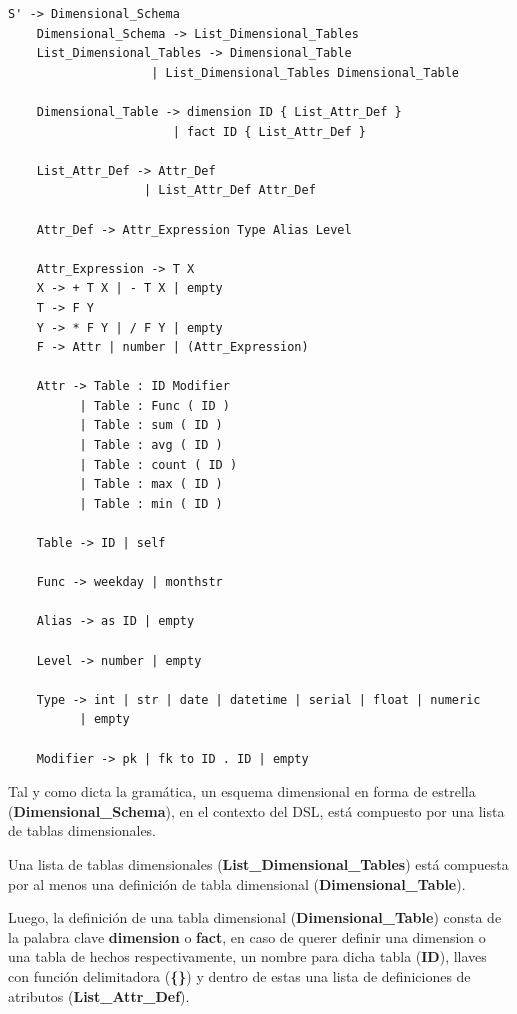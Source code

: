 \begin{lstlisting}[label={code:CFG},caption={Gram\'atica libre del contexto del lenguaje de dominio espec\'ifico}]
    S' -> Dimensional_Schema
    Dimensional_Schema -> List_Dimensional_Tables
    List_Dimensional_Tables -> Dimensional_Table
                    | List_Dimensional_Tables Dimensional_Table

    Dimensional_Table -> dimension ID { List_Attr_Def }
                       | fact ID { List_Attr_Def }

    List_Attr_Def -> Attr_Def
                   | List_Attr_Def Attr_Def

    Attr_Def -> Attr_Expression Type Alias Level

    Attr_Expression -> T X
    X -> + T X | - T X | empty
    T -> F Y
    Y -> * F Y | / F Y | empty
    F -> Attr | number | (Attr_Expression)

    Attr -> Table : ID Modifier
          | Table : Func ( ID )
          | Table : sum ( ID )
          | Table : avg ( ID )
          | Table : count ( ID )
          | Table : max ( ID )
          | Table : min ( ID )

    Table -> ID | self

    Func -> weekday | monthstr

    Alias -> as ID | empty

    Level -> number | empty

    Type -> int | str | date | datetime | serial | float | numeric 
          | empty

    Modifier -> pk | fk to ID . ID | empty
\end{lstlisting}

Tal y como dicta la gramática, un esquema dimensional en forma de estrella (\textbf{Dimensional\_Schema}), 
en el contexto del DSL, est\'a compuesto por una lista de tablas 
dimensionales. 

Una lista de tablas dimensionales (\textbf{List\_Dimensional\_Tables}) est\'a compuesta por al menos 
una definición de tabla dimensional 
(\textbf{Dimensional\_Table}). 

Luego, la 
definición de una tabla dimensional (\textbf{Dimensional\_Table}) consta de la palabra clave \textbf{dimension} o \textbf{fact}, 
en caso de querer definir una dimension o una tabla de hechos respectivamente, un nombre para dicha tabla 
(\textbf{ID}), llaves con función delimitadora (\textbf{\{\}}) y dentro de estas una lista de definiciones de atributos
(\textbf{List\_Attr\_Def}). 

